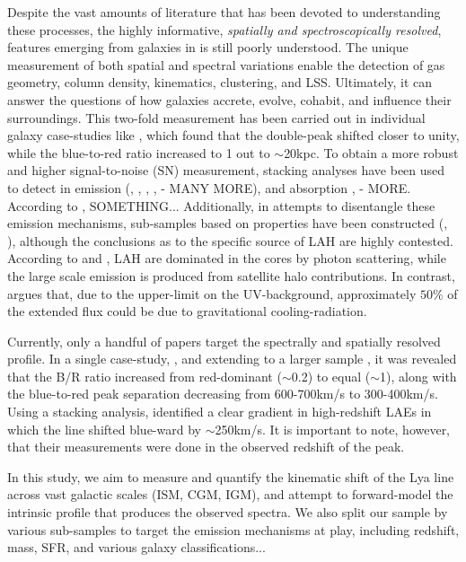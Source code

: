 \documentclass[linenumbers,amsmath,trackchanges,preprint2]{aastex702}
\begin{document}
\par Despite the vast amounts of literature that has been devoted to understanding these processes, the highly informative, \textit{spatially and spectroscopically resolved}, features emerging from galaxies in \lya is still poorly understood. The unique measurement of both spatial and spectral variations enable the detection of gas geometry, column density, kinematics, clustering, and LSS. Ultimately, it can answer the questions of how galaxies accrete, evolve, cohabit, and influence their surroundings. This two-fold measurement has been carried out in individual galaxy case-studies like \cite{erb2018}, which found that the \lya double-peak shifted closer to unity, while the blue-to-red ratio increased to 1 out to $\sim$20kpc. To obtain a more robust and higher signal-to-noise (SN) measurement, stacking analyses have been used to detect \lya in emission (\cite{steidel2011}, \cite{niemeyer2022hetdex}, \cite{erb2023}, \cite{guo2024muse}, \cite{trainor2025} - MANY MORE), and absorption {\cite{rudie2012}, \cite{chen2020} - MORE}. According to \cite{leclercq2017}, SOMETHING...
Additionally, in attempts to disentangle these emission mechanisms, sub-samples based on \lya properties have been constructed (\cite{steidel2011}, \cite{trainor2025}), although the conclusions as to the specific source of LAH are highly contested. According to \cite{niemeyer2022hetdex} and \cite{byrohl2021}, LAH are dominated in the cores by photon scattering, while the large scale emission is produced from satellite halo contributions. In contrast, \cite{lake2015} argues that, due to the upper-limit on the UV-background, approximately $50\%$ of the extended flux could be due to gravitational cooling-radiation.
\par Currently, only a handful of papers target the spectrally and spatially resolved \lya profile. In a single case-study, \cite{erb2018}, and extending to a larger sample \cite{erb2023}, it was revealed that the B/R ratio increased from red-dominant ($\sim$0.2) to equal ($\sim$1), along with the blue-to-red peak separation decreasing from 600-700km/s to 300-400km/s. Using a stacking analysis, \cite{guo2024spec} identified a clear gradient in high-redshift LAEs in which the \lya line shifted blue-ward by $\sim$250km/s. It is important to note, however, that their measurements were done in the observed redshift of the \lya peak.
\par In this study, we aim to measure and quantify the kinematic shift of the Lya line across vast galactic scales (ISM, CGM, IGM), and attempt to forward-model the intrinsic profile that produces the observed spectra. We also split our sample by various sub-samples to target the emission mechanisms at play, including redshift, mass, SFR, and various galaxy classifications...
\end{document}

